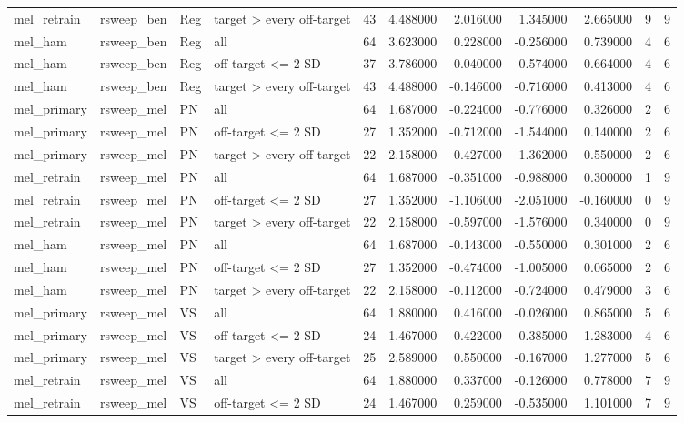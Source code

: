 \begin{table}
\begin{tabular}{llllrrrrrrr}
mel\_retrain & rsweep\_ben & Reg & target > every off-target & 43 & 4.488000 & 2.016000 & 1.345000 & 2.665000 & 9 & 9 \\
mel\_ham & rsweep\_ben & Reg & all & 64 & 3.623000 & 0.228000 & -0.256000 & 0.739000 & 4 & 6 \\
mel\_ham & rsweep\_ben & Reg & off-target <= 2 SD & 37 & 3.786000 & 0.040000 & -0.574000 & 0.664000 & 4 & 6 \\
mel\_ham & rsweep\_ben & Reg & target > every off-target & 43 & 4.488000 & -0.146000 & -0.716000 & 0.413000 & 4 & 6 \\
mel\_primary & rsweep\_mel & PN & all & 64 & 1.687000 & -0.224000 & -0.776000 & 0.326000 & 2 & 6 \\
mel\_primary & rsweep\_mel & PN & off-target <= 2 SD & 27 & 1.352000 & -0.712000 & -1.544000 & 0.140000 & 2 & 6 \\
mel\_primary & rsweep\_mel & PN & target > every off-target & 22 & 2.158000 & -0.427000 & -1.362000 & 0.550000 & 2 & 6 \\
mel\_retrain & rsweep\_mel & PN & all & 64 & 1.687000 & -0.351000 & -0.988000 & 0.300000 & 1 & 9 \\
mel\_retrain & rsweep\_mel & PN & off-target <= 2 SD & 27 & 1.352000 & -1.106000 & -2.051000 & -0.160000 & 0 & 9 \\
mel\_retrain & rsweep\_mel & PN & target > every off-target & 22 & 2.158000 & -0.597000 & -1.576000 & 0.340000 & 0 & 9 \\
mel\_ham & rsweep\_mel & PN & all & 64 & 1.687000 & -0.143000 & -0.550000 & 0.301000 & 2 & 6 \\
mel\_ham & rsweep\_mel & PN & off-target <= 2 SD & 27 & 1.352000 & -0.474000 & -1.005000 & 0.065000 & 2 & 6 \\
mel\_ham & rsweep\_mel & PN & target > every off-target & 22 & 2.158000 & -0.112000 & -0.724000 & 0.479000 & 3 & 6 \\
mel\_primary & rsweep\_mel & VS & all & 64 & 1.880000 & 0.416000 & -0.026000 & 0.865000 & 5 & 6 \\
mel\_primary & rsweep\_mel & VS & off-target <= 2 SD & 24 & 1.467000 & 0.422000 & -0.385000 & 1.283000 & 4 & 6 \\
mel\_primary & rsweep\_mel & VS & target > every off-target & 25 & 2.589000 & 0.550000 & -0.167000 & 1.277000 & 5 & 6 \\
mel\_retrain & rsweep\_mel & VS & all & 64 & 1.880000 & 0.337000 & -0.126000 & 0.778000 & 7 & 9 \\
mel\_retrain & rsweep\_mel & VS & off-target <= 2 SD & 24 & 1.467000 & 0.259000 & -0.535000 & 1.101000 & 7 & 9 \\

\end{tabular}
\end{table}
